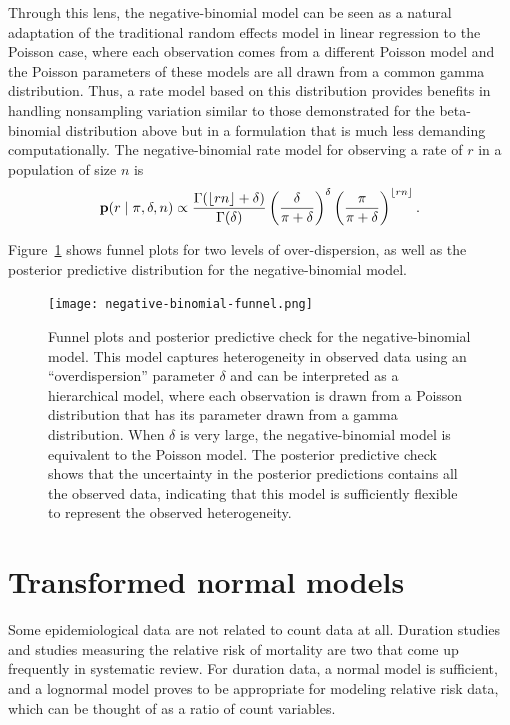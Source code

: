 Through this lens, the negative-binomial model can be seen as a
natural adaptation of the traditional random effects model in linear
regression to the Poisson case, where each observation comes from a
different Poisson model and the Poisson parameters of these models are
all drawn from a common gamma distribution. Thus, a rate model based on
this distribution provides benefits in handling nonsampling variation
similar to those demonstrated for the beta-binomial distribution
above but in a formulation that is much less demanding
computationally.  The negative-binomial rate model for observing a
rate of $r$ in a population of size $n$ is
\[
\mathbf{p}(r\;|\; \pi, \delta, n) \propto
 \frac{\Gamma(\lfloor rn \rfloor+\delta)}{\Gamma(\delta)}
 \left(\frac{\delta}{\pi+\delta}\right)^\delta \left(\frac{\pi}{\pi+\delta}\right)^{\lfloor rn\rfloor}.
\]

Figure~\ref{rate-model-negative-binomial-funnel} shows funnel plots
for two levels of over-dispersion, as well as the posterior predictive
distribution for the negative-binomial model.

\begin{figure}[ht]
\begin{center}
\texttt{[image: negative-binomial-funnel.png]}
\end{center}
\caption{Funnel plots and posterior predictive check for the
  negative-binomial model. This model captures heterogeneity in
  observed data using an ``overdispersion'' parameter $\delta$ and
  can be interpreted as a hierarchical model, where each observation
  is drawn from a Poisson distribution that has its parameter drawn
  from a gamma distribution.  When $\delta$ is very large, the
  negative-binomial model is equivalent to the Poisson model.  The
  posterior predictive check shows that the uncertainty in the
  posterior predictions contains all the observed data, indicating
  that this model is sufficiently flexible to represent the observed
  heterogeneity.} \label{rate-model-negative-binomial-funnel}
\end{figure}

\section{Transformed normal models}
\label{transformed-normal-models}
Some epidemiological data are not related to count data at all.
Duration studies and studies measuring the relative risk of mortality
are two that come up frequently in systematic review.  For duration
data, a normal model is sufficient, and a lognormal model proves to
be appropriate for modeling relative risk data, which can be thought
of as a ratio of count variables.

